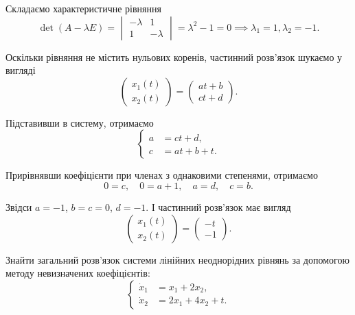 \begin{solution}
	Складаємо характеристичне рівняння
	\begin{equation*}
		\det (A - \lambda E) = \begin{vmatrix} - \lambda & 1 \\ 1 & - \lambda \end{vmatrix} = \lambda^2 - 1 = 0 \implies \lambda_1 = 1, \lambda_2 = -1.
	\end{equation*}

	Оскільки рівняння не містить нульових коренів, частинний розв'язок шукаємо у вигляді
	\begin{equation*}
		\begin{pmatrix} x_1(t) \\ x_2(t) \end{pmatrix} = \begin{pmatrix} a t + b \\ c t + d \end{pmatrix}.
	\end{equation*}

	Підставивши в систему, отримаємо
	\begin{equation*}
		\left\{
			\begin{aligned}
				a &= c t + d, \\
				c &= a t + b + t.
			\end{aligned}
		\right.
	\end{equation*}

	Прирівнявши коефіцієнти при членах з однаковими степенями, отримаємо
	\begin{equation*}
		0 = c, \quad 0 = a + 1, \quad a = d, \quad c = b.
	\end{equation*}

	Звідси $a = -1$, $b = c = 0$, $d = -1$. І частинний розв'язок має вигляд
	\begin{equation*}
		\begin{pmatrix} x_1(t) \\ x_2(t) \end{pmatrix} = \begin{pmatrix} - t \\ - 1 \end{pmatrix}.
	\end{equation*}
\end{solution}

\begin{example}
	Знайти загальний розв'язок системи лінійних неоднорідних рівнянь за допомогою методу невизначених коефіцієнтів:
	\begin{equation*}
		\left\{
			\begin{aligned}
				\dot x_1 &= x_1 + 2 x_2, \\
				\dot x_2 &= 2 x_1 + 4 x_2 + t.
			\end{aligned}
		\right.
	\end{equation*}
\end{example}

